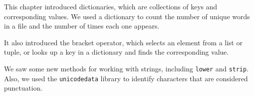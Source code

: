 This chapter introduced dictionaries, which are collections of keys and
corresponding values. We used a dictionary to count the number of unique
words in a file and the number of times each one appears.

It also introduced the bracket operator, which selects an element from a
list or tuple, or looks up a key in a dictionary and finds the
corresponding value.

We saw some new methods for working with strings, including
\passthrough{\lstinline!lower!} and \passthrough{\lstinline!strip!}.
Also, we used the \passthrough{\lstinline!unicodedata!} library to
identify characters that are considered punctuation.

